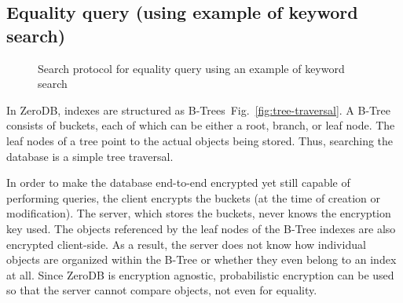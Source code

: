 \documentclass[notitlepage]{revtex4-1}
\newcommand{\figref}[1]{Fig.~\ref{#1}}
\begin{document}
\subsection{Equality query (using example of keyword search)}
\begin{figure}
	\begin{center}
        \qquad
	\end{center}
    \caption{Search protocol for equality query using an example of keyword search}
	\label{fig:btree-protocol}
\end{figure}

In ZeroDB, indexes are structured as B-Trees~\figref{fig:tree-traversal}.
A B-Tree consists of buckets, each of which can be either a root, branch, or leaf node.
The leaf nodes of a tree point to the actual objects being stored.
Thus, searching the database is a simple tree traversal.

In order to make the database end-to-end encrypted yet still capable of performing queries, the client encrypts the buckets (at the time of creation or modification).
The server, which stores the buckets, never knows the encryption key used.
The objects referenced by the leaf nodes of the B-Tree indexes are also encrypted client-side.
As a result, the server does not know how individual objects are organized within the B-Tree or whether they even belong to an index at all.
Since ZeroDB is encryption agnostic, probabilistic encryption can be used so that the server cannot compare objects, not even for equality.
\end{document}
